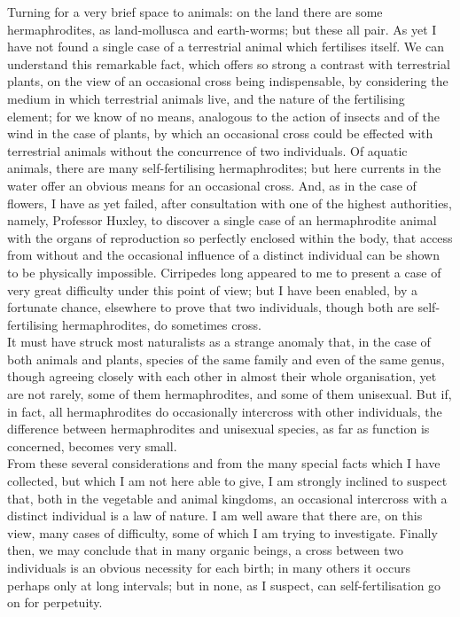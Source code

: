 \indent Turning for a very brief space to animals: on the land there are some hermaphrodites, as land-mollusca and earth-worms; but these all pair. As yet I have not found a single case of a terrestrial animal which fertilises itself. We can understand this remarkable fact, which offers so strong a contrast with terrestrial plants, on the view of an occasional cross being indispensable, by considering the medium in which terrestrial animals live, and the nature of the fertilising element; for we know of no means, analogous to the action of insects and of the wind in the case of plants, by which an occasional cross could be effected with terrestrial animals without the concurrence of two individuals. Of aquatic animals, there are many self-fertilising hermaphrodites; but here currents in the water offer an obvious means for an occasional cross. And, as in the case of flowers, I have as yet failed, after consultation with one of the highest authorities, namely, Professor Huxley, to discover a single case of an hermaphrodite animal with the organs of reproduction so perfectly enclosed within the body, that access from without and the occasional influence of a distinct individual can be shown to be physically impossible. Cirripedes long appeared to me to present a case of very great difficulty under this point of view; but I have been enabled, by  a fortunate chance, elsewhere to prove that two individuals, though both are self-fertilising hermaphrodites, do sometimes cross. \\
\indent It must have struck most naturalists as a strange anomaly that, in the case of both animals and plants, species of the same family and even of the same genus, though agreeing closely with each other in almost their whole organisation, yet are not rarely, some of them hermaphrodites, and some of them unisexual. But if, in fact, all hermaphrodites do occasionally intercross with other individuals, the difference between hermaphrodites and unisexual species, as far as function is concerned, becomes very small. \\
\indent From these several considerations and from the many special facts which I have collected, but which I am not here able to give, I am strongly inclined to suspect that, both in the vegetable and animal kingdoms, an occasional intercross with a distinct individual is a law of nature. I am well aware that there are, on this view, many cases of difficulty, some of which I am trying to investigate. Finally then, we may conclude that in many organic beings, a cross between two individuals is an obvious necessity for each birth; in many others it occurs perhaps only at long intervals; but in none, as I suspect, can self-fertilisation go on for perpetuity. \\

